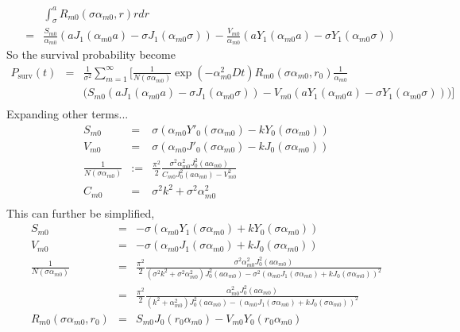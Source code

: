 \documentclass{article}
\begin{document}
\begin{eqnarray}
    & & \int_\sigma^a R_{m0}(\sigma\alpha_{m0}, r) rdr \nonumber\\
    &=& \frac{S_{m0}}{\alpha_{m0}} \left(aJ_1(\alpha_{m0}a) - \sigma J_1(\alpha_{m0}\sigma)\right) -
        \frac{V_{m0}}{\alpha_{m0}} \left(aY_1(\alpha_{m0}a) - \sigma Y_1(\alpha_{m0}\sigma)\right) \nonumber
\end{eqnarray}
%
So the survival probability become
%
\begin{eqnarray}
        P_{\mathrm{surv}}(t)
    &=& \frac{1}{\sigma^2} \sum_{m=1}^{\infty} \Bigg[
        \frac{1}{N(\sigma\alpha_{m0})} \exp(-\alpha_{m0}^2Dt)
        R_{m0}(\sigma\alpha_{m0}, r_0)
        \frac{1}{\alpha_{m0}}
        \nonumber\\
    & & \Big(
        S_{m0} \left(aJ_1(\alpha_{m0}a) - \sigma J_1(\alpha_{m0}\sigma)\right) -
        V_{m0} \left(aY_1(\alpha_{m0}a) - \sigma Y_1(\alpha_{m0}\sigma)\right)
        \Big)
        \Bigg] \nonumber\\
\end{eqnarray}
%
Expanding other terms...
%
\begin{eqnarray}
    S_{m0} &=& \sigma(\alpha_{m0}Y'_0(\sigma\alpha_{m0}) - kY_0(\sigma\alpha_{m0})) \\
    V_{m0} &=& \sigma(\alpha_{m0}J'_0(\sigma\alpha_{m0}) - kJ_0(\sigma\alpha_{m0})) \\
    \frac{1}{N(\sigma\alpha_{m0})} &:=&
        \frac{\pi^2}{2}
        \frac{\sigma^2\alpha_{m0}^2 J^2_0(a\alpha_{m0})}
             {C_{m0} J_0^2(a\alpha_{m0}) - V_{m0}^2} \\
    C_{m0} &=& \sigma^2k^2 + \sigma^2\alpha_{m0}^2\\
\end{eqnarray}
%
This can further be simplified,
%
\begin{eqnarray}
    S_{m0} &=& -\sigma(\alpha_{m0}Y_1(\sigma\alpha_{m0}) + kY_0(\sigma\alpha_{m0})) \\
    V_{m0} &=& -\sigma(\alpha_{m0}J_1(\sigma\alpha_{m0}) + kJ_0(\sigma\alpha_{m0})) \\
    \frac{1}{N(\sigma\alpha_{m0})} &=&
        \frac{\pi^2}{2}
        \frac{\sigma^2\alpha_{m0}^2 J^2_0(a\alpha_{m0})}
             {(\sigma^2k^2 + \sigma^2\alpha_{m0}^2) J_0^2(a\alpha_{m0}) -
              \sigma^2(\alpha_{m0}J_1(\sigma\alpha_{m0}) + kJ_0(\sigma\alpha_{m0}))^2} \\
           &=& \frac{\pi^2}{2}
        \frac{\alpha_{m0}^2 J^2_0(a\alpha_{m0})}
             {(k^2 + \alpha_{m0}^2) J_0^2(a\alpha_{m0}) -
              (\alpha_{m0}J_1(\sigma\alpha_{m0}) + kJ_0(\sigma\alpha_{m0}))^2} \\
    R_{m0}(\sigma\alpha_{m0}, r_0) &=& S_{m0}J_0(r_0\alpha_{m0}) - V_{m0}Y_0(r_0\alpha_{m0})
\end{eqnarray}
\end{document}
